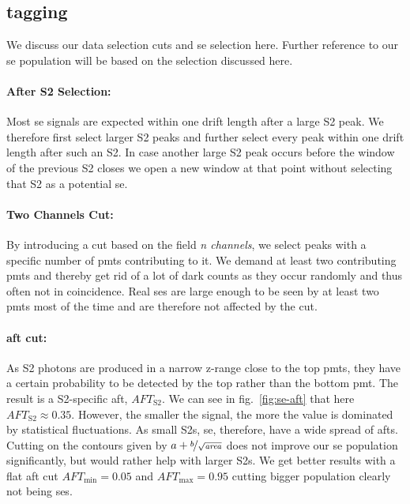 
\FloatBarrier
\subsection{tagging}
\label{ssec:tagging}
\FloatBarrier


We discuss our data selection cuts and \gls{se} selection here.
Further reference to our \gls{se} population will be based on the selection discussed here.

\paragraph{After S2 Selection:} Most \gls{se} signals are expected within one drift length after a large S2 peak.
We therefore first select larger S2 peaks and further select every peak within one drift length after such an S2.
In case another large S2 peak occurs before the window of the previous S2 closes we open a new window at that point without selecting that S2 as a potential \gls{se}.


\paragraph{Two Channels Cut:} By introducing a cut based on the field \emph{n channels}, we select peaks with a specific number of \glspl{pmt} contributing to it.
We demand at least two contributing \glspl{pmt} and thereby get rid of a lot of dark counts as they occur randomly and thus often not in coincidence.
Real \glspl{se} are large enough to be seen by at least two \glspl{pmt} most of the time and are therefore not affected by the cut.

\paragraph{\gls{aft} cut:} As S2 photons are produced in a narrow z-range close to the top \glspl{pmt}, they have a certain probability to be detected by the top rather than the bottom \gls{pmt}.
The result is a S2-specific \gls{aft}, $ \mathit{AFT}_\mathrm{S2} $.
We can see in fig.~\ref{fig:se-aft} that here $ \mathit{AFT}_\mathrm{S2} \approx 0.35 $.
However, the smaller the signal, the more the value is dominated by statistical fluctuations.
As small S2s, \gls{se}, therefore, have a wide spread of \glspl{aft}.
Cutting on the contours given by $ a + \nicefrac{b}{\sqrt{\mathit{area}}} $ does not improve our \gls{se} population significantly, but would rather help with larger S2s.
We get better results with a flat \gls{aft} cut $ \mathit{AFT}_\mathrm{min} = 0.05 $ and $ \mathit{AFT}_\mathrm{max} = 0.95 $ cutting bigger population clearly not being \glspl{se}.

